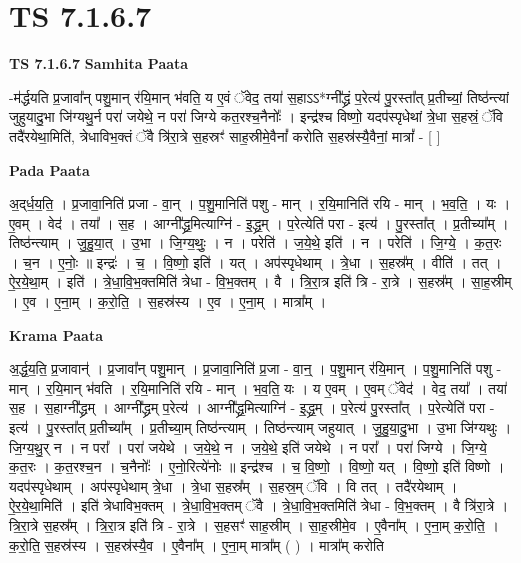 \documentclass[17pt]{extarticle}
\begin{document}
\section{ TS 7.1.6.7 }

\textbf{TS 7.1.6.7 } \newline
\textbf{Samhita Paata} \newline

-म॑र्द्धयति प्र॒जावा᳚न् पशु॒मान् र॑यि॒मान् भ॑वति॒ य ए॒वं ॅवेद॒ तया॑ स॒हाऽऽ*ग्नी᳚द्ध्रं प॒रेत्य॑ पु॒रस्ता᳚त् प्र॒तीच्यां॒ तिष्ठ॑न्त्यां जुहुयादु॒भा जि॑ग्यथु॒र्न परा॑ जयेथे॒ न परा॑ जिग्ये कत॒रश्च॒नैनोः᳚ । इन्द्र॑श्च विष्णो॒ यदप॑स्पृधेथां त्रे॒धा स॒हस्रं॒ ॅवि तदै॑रयेथा॒मिति॑, त्रेधाविभ॒क्तं ॅवै त्रि॑रा॒त्रे स॒हस्रꣳ॑ साह॒स्रीमे॒वैनां᳚ करोति स॒हस्र॑स्यै॒वैनां॒ मात्रां᳚ - [  ] \newline

\textbf{Pada Paata} \newline

अ॒द्‌र्ध॒य॒ति॒ । प्र॒जावा॒निति॑ प्रजा - वा॒न् । प॒शु॒मानिति॑ पशु - मान् । र॒यि॒मानिति॑ रयि - मान् । भ॒व॒ति॒ । यः । ए॒वम् । वेद॑ । तया᳚ । स॒ह । आग्नी᳚द्ध्र॒मित्याग्नि॑ - इ॒द्ध्र॒म् । प॒रेत्येति॑ परा - इत्य॑ । पु॒रस्ता᳚त् । प्र॒तीच्या᳚म् । तिष्ठ॑न्त्याम् । जु॒हु॒या॒त् । उ॒भा । जि॒ग्य॒थुः॒ । न । परेति॑ । ज॒ये॒थे॒ इति॑ । न । परेति॑ । जि॒ग्ये॒ । क॒त॒रः । च॒न । ए॒नोः॒ ॥ इन्द्रः॑ । च॒ । वि॒ष्णो॒ इति॑ । यत् । अप॑स्पृधेथाम् । त्रे॒धा । स॒हस्र᳚म् । वीति॑ । तत् । ऐ॒र॒ये॒था॒म् । इति॑ । त्रे॒धा॒वि॒भ॒क्तमिति॑ त्रेधा - वि॒भ॒क्तम् । वै । त्रि॒रा॒त्र इति॑ त्रि - रा॒त्रे । स॒हस्र᳚म् । सा॒ह॒स्रीम् । ए॒व । ए॒ना॒म् । क॒रो॒ति॒ । स॒हस्र॑स्य । ए॒व । ए॒ना॒म् । मात्रा᳚म् ।  \newline


\textbf{Krama Paata} \newline

अ॒र्द्ध॒य॒ति॒ प्र॒जावान्॑ । प्र॒जावा᳚न् पशु॒मान् । प्र॒जावा॒निति॑ प्र॒जा - वा॒न्॒ । प॒शु॒मान् र॑यि॒मान् । प॒शु॒मानिति॑ पशु - मान् । र॒यि॒मान् भ॑वति । र॒यि॒मानिति॑ रयि - मान् । भ॒व॒ति॒ यः । य ए॒वम् । ए॒वम् ॅवेद॑ । वेद॒ तया᳚ । तया॑ स॒ह । स॒हाग्नी᳚द्ध्रम् । आग्नी᳚द्ध्रम् प॒रेत्य॑ । आग्नी᳚द्ध्र॒मित्याग्नि॑ - इ॒द्ध्र॒म् । प॒रेत्य॑ पु॒रस्ता᳚त् । प॒रेत्येति॑ परा - इत्य॑ । पु॒रस्ता᳚त् प्र॒तीच्या᳚म् । प्र॒तीच्या॒म् तिष्ठ॑न्त्याम् । तिष्ठ॑न्त्याम् जहुयात् । जु॒हु॒या॒दु॒भा । उ॒भा जि॑ग्यथुः । जि॒ग्य॒थु॒र् न । न परा᳚ । परा॑ जयेथे । ज॒ये॒थे॒ न । ज॒ये॒थे॒ इति॑ जयेथे । न परा᳚ । परा॑ जिग्ये । जि॒ग्ये॒ क॒त॒रः । क॒त॒रश्च॒न । च॒नैनोः᳚ । ए॒नो॒रित्ये॑नोः ॥ इन्द्र॑श्च । च॒ वि॒ष्णो॒ । वि॒ष्णो॒ यत् । वि॒ष्णो॒ इति॑ विष्णो । यदप॑स्पृधेथाम् । अप॑स्पृधेथाम् त्रे॒धा । त्रे॒धा स॒हस्र᳚म् । स॒हस्र॒म् ॅवि । वि तत् । तदै॑रयेथाम् । ऐ॒र॒ये॒था॒मिति॑ । इति॑ त्रेधाविभ॒क्तम् । त्रे॒धा॒वि॒भ॒क्तम् ॅवै । त्रे॒धा॒वि॒भ॒क्तमिति॑ त्रेधा - वि॒भ॒क्तम् । वै त्रि॑रा॒त्रे । त्रि॒रा॒त्रे स॒हस्र᳚म् । त्रि॒रा॒त्र इति॑ त्रि - रा॒त्रे । स॒हसꣳ॑ साह॒स्रीम् । सा॒ह॒स्रीमे॒व । ए॒वैना᳚म् । ए॒ना॒म् क॒रो॒ति॒ । क॒रो॒ति॒ स॒हस्र॑स्य । स॒हस्र॑स्यै॒व । ए॒वैना᳚म् । ए॒ना॒म् मात्रा᳚म् ( ) । मात्रा᳚म् करोति \newline
\end{document}
